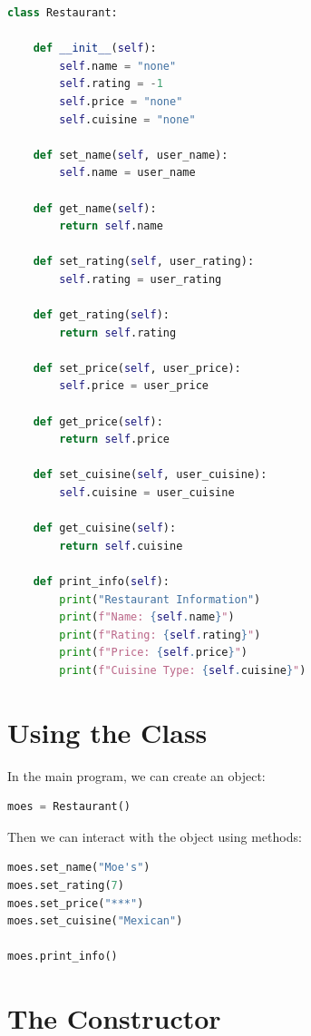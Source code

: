\documentclass[11pt]{article}
\begin{document}
\begin{lstlisting}[language=Python]
class Restaurant:

    def __init__(self):
        self.name = "none"
        self.rating = -1
        self.price = "none"
        self.cuisine = "none"

    def set_name(self, user_name):
        self.name = user_name

    def get_name(self):
        return self.name

    def set_rating(self, user_rating):
        self.rating = user_rating

    def get_rating(self):
        return self.rating

    def set_price(self, user_price):
        self.price = user_price

    def get_price(self):
        return self.price

    def set_cuisine(self, user_cuisine):
        self.cuisine = user_cuisine

    def get_cuisine(self):
        return self.cuisine

    def print_info(self):
        print("Restaurant Information")
        print(f"Name: {self.name}")
        print(f"Rating: {self.rating}")
        print(f"Price: {self.price}")
        print(f"Cuisine Type: {self.cuisine}")
\end{lstlisting}

\section{Using the Class}

In the main program, we can create an object:

\begin{lstlisting}[language=Python]
moes = Restaurant()
\end{lstlisting}

Then we can interact with the object using methods:

\begin{lstlisting}[language=Python]
moes.set_name("Moe's")
moes.set_rating(7)
moes.set_price("***")
moes.set_cuisine("Mexican")

moes.print_info()
\end{lstlisting}

\section{The Constructor}
\end{document}
